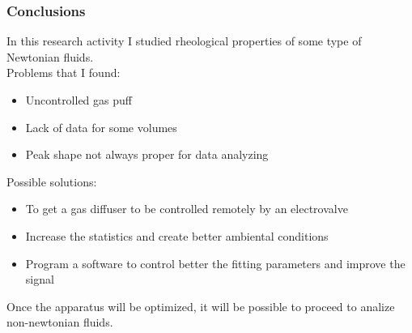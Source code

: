 \documentclass[xcolor=table]{beamer}
\begin{document}
\begin{frame}

\frametitle{Conclusions}
\fontsize{11}{10.2} \selectfont

In this research activity I studied rheological properties of some type of Newtonian fluids.\\
\medskip
Problems that I found:
\begin{itemize}
	\item Uncontrolled gas puff
	\item Lack of data for some volumes
	\item Peak shape not always proper for data analyzing
	
\end{itemize}
\medskip 
Possible solutions:
\begin{itemize}
	\item To get a gas diffuser to be controlled remotely by an electrovalve
	\item Increase the statistics and create better ambiental conditions
	\item Program a software to control better the fitting parameters and improve the signal
\end{itemize}
\medskip
Once the apparatus will be optimized,  it will be possible to proceed to analize non-newtonian fluids.
\end{frame}
\end{document}
